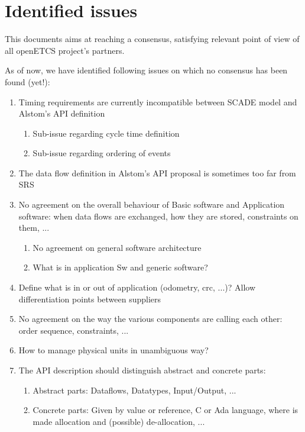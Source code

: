 \section{Identified issues}

This documents aims at reaching a consensus, satisfying relevant point
of view of all openETCS project's partners.

As of now, we have identified following issues on which no consensus
has been found (yet!):
\begin{enumerate}
\item Timing requirements are currently incompatible between SCADE
  model and Alstom's API definition
  \begin{enumerate}
  \item 	Sub-issue regarding cycle time definition
  \item 	Sub-issue regarding ordering of events
  \end{enumerate}
\item The data flow definition in Alstom's API proposal is sometimes
  too far from SRS
\item No agreement on the overall behaviour of Basic software and
  Application software: when data flows are exchanged, how they are
  stored, constraints on them, ...
  \begin{enumerate}
  \item No agreement on general software architecture
  \item What is in application Sw and generic software?
  \end{enumerate}
\item Define what is in or out of application (odometry, crc, ...)?
  Allow differentiation points between suppliers
\item No agreement on the way the various components are calling each
  other: order sequence, constraints, ...
\item How to manage physical units in unambiguous way?
\item The API description should distinguish abstract and concrete
  parts:
  \begin{enumerate}
  \item Abstract parts: Dataflows, Datatypes, Input/Output, ...
  \item Concrete parts: Given by value or reference, C or Ada
    language, where is made allocation and (possible) de-allocation,
    ...
  \end{enumerate}
\end{enumerate}

